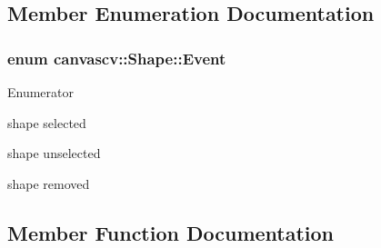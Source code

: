\subsection{Member Enumeration Documentation}
\subsubsection[{\texorpdfstring{Event}{Event}}]{\setlength{\rightskip}{0pt plus 5cm}enum {\bf canvascv\+::\+Shape\+::\+Event}}\hypertarget{classcanvascv_1_1Shape_a3fa381d7be3c6bb3cd736e237a444d5c}{}\label{classcanvascv_1_1Shape_a3fa381d7be3c6bb3cd736e237a444d5c}
\begin{Desc}
\item[Enumerator]\par
\begin{description}
\item[{\em 
S\+E\+L\+E\+CT\hypertarget{classcanvascv_1_1Shape_a3fa381d7be3c6bb3cd736e237a444d5cafeb2f2cbc576f5235afac464e54a7450}{}\label{classcanvascv_1_1Shape_a3fa381d7be3c6bb3cd736e237a444d5cafeb2f2cbc576f5235afac464e54a7450}
}]shape selected \item[{\em 
U\+N\+S\+E\+L\+E\+CT\hypertarget{classcanvascv_1_1Shape_a3fa381d7be3c6bb3cd736e237a444d5cafea26e438446b822586b19d85b9c1f44}{}\label{classcanvascv_1_1Shape_a3fa381d7be3c6bb3cd736e237a444d5cafea26e438446b822586b19d85b9c1f44}
}]shape unselected \item[{\em 
R\+E\+M\+O\+V\+ED\hypertarget{classcanvascv_1_1Shape_a3fa381d7be3c6bb3cd736e237a444d5caa6787a2dc8627b989f9befaf2e50c9ad}{}\label{classcanvascv_1_1Shape_a3fa381d7be3c6bb3cd736e237a444d5caa6787a2dc8627b989f9befaf2e50c9ad}
}]shape removed \end{description}
\end{Desc}


\subsection{Member Function Documentation}
